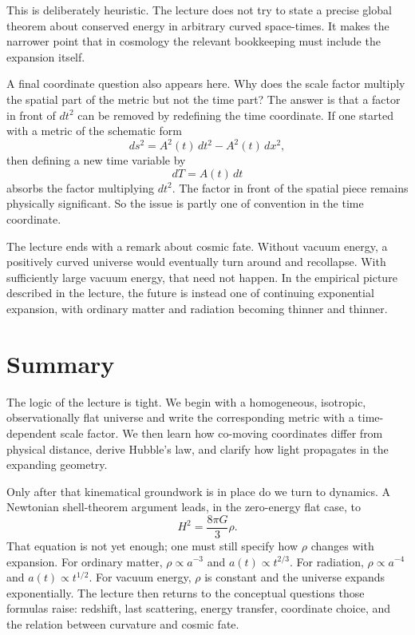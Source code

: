 This is deliberately heuristic. The lecture does not try to state a precise global theorem about conserved energy in arbitrary curved space-times. It makes the narrower point that in cosmology the relevant bookkeeping must include the expansion itself.

A final coordinate question also appears here. Why does the scale factor multiply the spatial part of the metric but not the time part? The answer is that a factor in front of \(dt^2\) can be removed by redefining the time coordinate. If one started with a metric of the schematic form
\begin{equation}
ds^2 = A^2(t)\,dt^2 - A^2(t)\,dx^2,
\end{equation}
then defining a new time variable by
\begin{equation}
dT = A(t)\,dt
\end{equation}
absorbs the factor multiplying \(dt^2\). The factor in front of the spatial piece remains physically significant. So the issue is partly one of convention in the time coordinate.

The lecture ends with a remark about cosmic fate. Without vacuum energy, a positively curved universe would eventually turn around and recollapse. With sufficiently large vacuum energy, that need not happen. In the empirical picture described in the lecture, the future is instead one of continuing exponential expansion, with ordinary matter and radiation becoming thinner and thinner.

\section{Summary}

The logic of the lecture is tight. We begin with a homogeneous, isotropic, observationally flat universe and write the corresponding metric with a time-dependent scale factor. We then learn how co-moving coordinates differ from physical distance, derive Hubble's law, and clarify how light propagates in the expanding geometry.

Only after that kinematical groundwork is in place do we turn to dynamics. A Newtonian shell-theorem argument leads, in the zero-energy flat case, to
\[
H^2=\frac{8\pi G}{3}\rho.
\]
That equation is not yet enough; one must still specify how \(\rho\) changes with expansion. For ordinary matter, \(\rho\propto a^{-3}\) and \(a(t)\propto t^{2/3}\). For radiation, \(\rho\propto a^{-4}\) and \(a(t)\propto t^{1/2}\). For vacuum energy, \(\rho\) is constant and the universe expands exponentially. The lecture then returns to the conceptual questions those formulas raise: redshift, last scattering, energy transfer, coordinate choice, and the relation between curvature and cosmic fate.